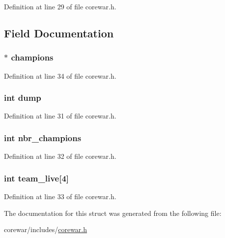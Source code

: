 Definition at line 29 of file corewar.\-h.



\subsection{Field Documentation}
\hypertarget{structs__corewar_a2d2d5697f388905b044f2cde1f481d2d}{
\subsubsection[{champions}]{$\ast$ champions}}\label{structs__corewar_a2d2d5697f388905b044f2cde1f481d2d}


Definition at line 34 of file corewar.\-h.

\hypertarget{structs__corewar_a28773f3c282d16757e3a3e1027825a17}{
\subsubsection[{dump}]{\setlength{\rightskip}{0pt plus 5cm}int dump}}\label{structs__corewar_a28773f3c282d16757e3a3e1027825a17}


Definition at line 31 of file corewar.\-h.

\hypertarget{structs__corewar_aa5715503159a366aea104fae729231db}{
\subsubsection[{nbr\-\_\-champions}]{\setlength{\rightskip}{0pt plus 5cm}int nbr\-\_\-champions}}\label{structs__corewar_aa5715503159a366aea104fae729231db}


Definition at line 32 of file corewar.\-h.

\hypertarget{structs__corewar_ab318b23ba3b1ec05a71a3edb155255d6}{
\subsubsection[{team\-\_\-live}]{\setlength{\rightskip}{0pt plus 5cm}int team\-\_\-live\mbox{[}4\mbox{]}}}\label{structs__corewar_ab318b23ba3b1ec05a71a3edb155255d6}


Definition at line 33 of file corewar.\-h.



The documentation for this struct was generated from the following file\-:\begin{DoxyCompactItemize}
\item 
corewar/includes/\hyperlink{corewar_8h}{corewar.\-h}\end{DoxyCompactItemize}
